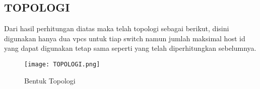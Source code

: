 \documentclass[12pt, a4paper]{article}
\begin{document}
\newpage

\begin{center}
  \section*{TOPOLOGI}
\end{center}

\vspace{1cm}

  Dari hasil perhitungan diatas maka telah topologi sebagai berikut, disini
  digunakan hanya dua vpcs untuk tiap switch namun jumlah maksimal host id yang
  dapat digunakan tetap sama seperti yang telah diperhitungkan sebelumnya.

  \begin{figure}[h]
      \centering
      \texttt{[image: TOPOLOGI.png]}
      \caption{Bentuk Topologi}
  \end{figure}
\end{document}
